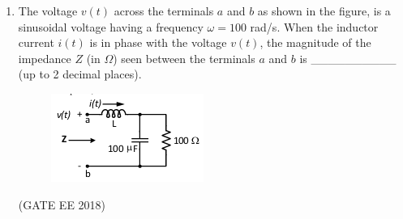 \documentclass[journal,12pt,onecolumn]{IEEEtran}
\theoremstyle{remark}
\begin{document}
\begin{enumerate}
\item The voltage $v(t)$ across the terminals $a$ and $b$ as shown in the figure, is a sinusoidal voltage having a frequency $\omega = 100$ rad/s. When the inductor current $i(t)$ is in phase with the voltage $v(t)$, the magnitude of the impedance $Z$ (in $\Omega$) seen between the terminals $a$ and $b$ is \_\_\_\_\_\_\_\_\_\_ (up to 2 decimal places).
\begin{figure}[H]
    \centering
    \includegraphics[]{figs/Q.55.png}
    \caption{}
    \label{fig:26}
\end{figure}
\hfill{(GATE EE 2018)}

\end{enumerate}
\end{document}

